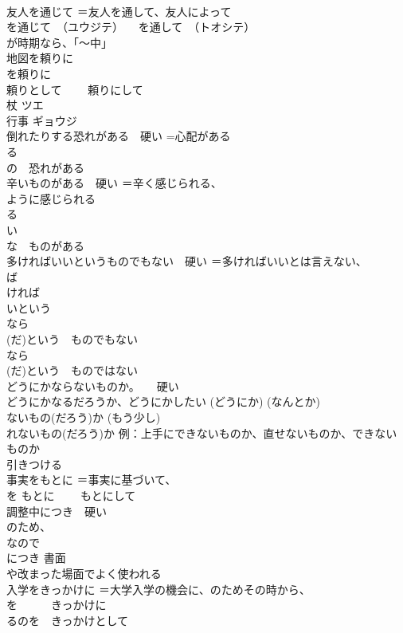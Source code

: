 \documentclass[8pt]{extreport}
\begin{document}
\begin{CJK}{UTF8}{min}
\\	友人を通じて	＝友人を通して、友人によって 
\\	を通じて　（ユウジテ） 　を通して　（トオシテ） 
\\	が時期なら、「〜中」
\\	地図を頼りに	
\\	を頼りに
\\	頼りとして 　　頼りにして
\\	杖	ツエ 
\\	行事	ギョウジ 
\\	倒れたりする恐れがある　硬い	=心配がある 
\\	る 
\\	の　恐れがある
\\	辛いものがある　硬い	＝辛く感じられる、
\\	ように感じられる 
\\	る 
\\	い 
\\	な　ものがある
\\	多ければいいというものでもない　硬い	＝多ければいいとは言えない、
\\	ば 
\\	ければ　
\\	いという 
\\	なら 
\\	(だ)という　ものでもない 
\\	なら 
\\	(だ)という　ものではない
\\	どうにかならないものか。　　硬い	
\\	どうにかなるだろうか、どうにかしたい (どうにか) (なんとか) 
\\	ないもの(だろう)か (もう少し) 
\\	れないもの(だろう)か 例：上手にできないものか、直せないものか、できないものか
\\	引きつける	
\\	事実をもとに	＝事実に基づいて、
\\	を もとに 　　もとにして
\\	調整中につき　硬い	
\\	のため、
\\	なので 
\\	につき 書面
\\	や改まった場面でよく使われる
\\	入学をきっかけに	＝大学入学の機会に、のためその時から、
\\	を　　　きっかけに 
\\	るのを　きっかけとして 

\end{CJK}
\end{document}
